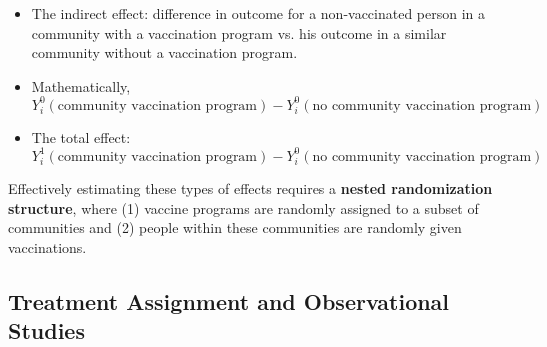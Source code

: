 \documentclass[12 pt, leqno]{article}
\begin{document}
\begin{itemize}
\item The indirect effect: difference in outcome for a non-vaccinated person in a community with a vaccination program vs. his outcome in a similar community without a vaccination program.

\item Mathematically, $Y_i^0(\text{community vaccination program}) - Y_i^0(\text{no community vaccination program})$

\item The total effect: $Y_i^1(\text{community vaccination program}) - Y_i^0(\text{no community vaccination program})$
\end{itemize}

Effectively estimating these types of effects requires a \textbf{nested randomization structure}, where (1) vaccine programs are randomly assigned to a subset of communities and (2) people within these communities are randomly given vaccinations.

\subsection{Treatment Assignment and Observational Studies}
\end{document}
